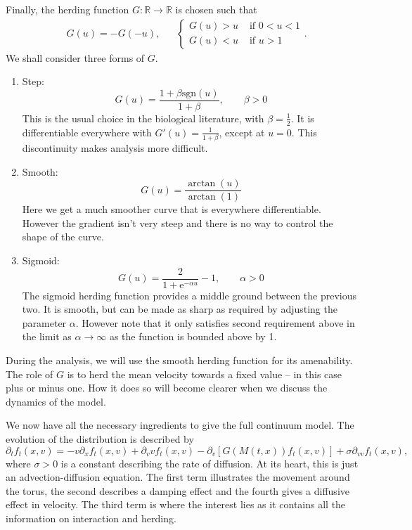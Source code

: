 \documentclass[11pt, a4pape draft]{article}
\renewcommand{\R}{\mathbb{R}}
\begin{document}
		Finally, the herding function $G:\R \to \R$ is chosen such that
		\begin{align*}
			&G(u)=-G(-u),&& {\begin{cases}
								G(u)>u & \text{ if } 0< u <1\\
								G(u)<u & \text{ if } u > 1
				   		   \end{cases}}.
		\end{align*}
		We shall consider three forms of $G$.
		\begin{enumerate}
			\item Step:
			\[
				G(u) = \frac{1+\beta \mathrm{sgn}(u)}{1+\beta}, \qquad \beta > 0	
			\]
			This is the usual choice in the biological literature, with \(\beta = \frac{1}{2}\). It is differentiable everywhere with $G'(u) = \frac{1}{1+\beta}$, except at $u=0$. This discontinuity makes analysis more difficult.
			\item Smooth:
			\[
				G(u) = \frac{\arctan(u)}{\arctan(1)}
			\]
			Here we get a much smoother curve that is everywhere differentiable. However the gradient isn't very steep and there is no way to control the shape of the curve.
			\item Sigmoid:
			\[
				G(u) = \frac{2}{1+\mathrm{e}^{-\alpha u}} - 1 , \qquad \alpha >0
			\]
			The sigmoid herding function provides a middle ground between the previous two. It is smooth, but can be made as sharp as required by adjusting the parameter $\alpha$. However note that it only satisfies second requirement above in the limit as $\alpha \to \infty$ as the function is bounded above by 1.
		\end{enumerate}
		During the analysis, we will use the smooth herding function for its amenability. The role of $G$ is to herd the mean velocity towards a fixed value -- in this case plus or minus one. How it does so will become clearer when we discuss the dynamics of the model.
		
		We now have all the necessary ingredients to give the full continuum model. The evolution of the distribution is described by
		\begin{equation}\label{eq:fullPDE}
			\partial_t f_t(x,v) = -v\partial_x f_t(x,v)  +\partial_v v f_t(x,v) - \partial_v \left[ G(M(t,x))f_t(x,v)\right] + \sigma \partial_{vv}f_t(x,v),
		\end{equation}
		where $\sigma > 0$ is a constant describing the rate of diffusion. At its heart, this is just an advection-diffusion equation. The first term illustrates the movement around the torus, the second describes a damping effect and the fourth gives a diffusive effect in velocity. The third term is where the interest lies as it contains all the information on interaction and herding.
		
\end{document}
